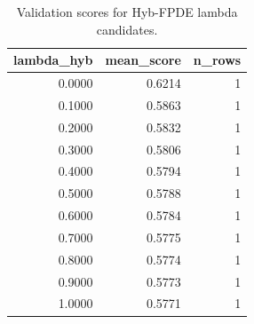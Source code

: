 \begin{table}[t]
\caption{Validation scores for Hyb-FPDE lambda candidates.}
\label{tab:lambda_distribution_computed}
\centering
\begin{tabular}{rrr}
\toprule
lambda\_hyb & mean\_score & n\_rows \\
\midrule
0.0000 & 0.6214 & 1 \\
0.1000 & 0.5863 & 1 \\
0.2000 & 0.5832 & 1 \\
0.3000 & 0.5806 & 1 \\
0.4000 & 0.5794 & 1 \\
0.5000 & 0.5788 & 1 \\
0.6000 & 0.5784 & 1 \\
0.7000 & 0.5775 & 1 \\
0.8000 & 0.5774 & 1 \\
0.9000 & 0.5773 & 1 \\
1.0000 & 0.5771 & 1 \\
\bottomrule
\end{tabular}

\end{table}
